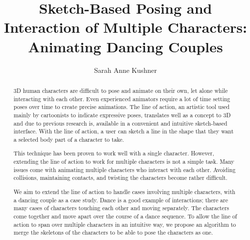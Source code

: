 \documentclass[12pt, a4paper, parskip=full, dvipsnames]{memoir} %
\title{Sketch-Based Posing and Interaction of Multiple Characters: Animating Dancing Couples} %
\author{Sarah Anne Kushner}
\date{\mydate} %
\begin{document}
\frontmatter
\begin{titlingpage}
\maketitle
\end{titlingpage}


\renewcommand{\abstracttextfont}{\normalfont}
\abstractintoc
\begin{abstract} 
3D human characters are difficult to pose and animate on their own, let alone while interacting with each other. Even experienced animators require a lot of time setting poses over time to create precise animations. The line of action, an artistic tool used mainly by cartoonists to indicate expressive poses, translates well as a concept to 3D and due to previous research is, available in a convenient and intuitive sketch-based interface. With the line of action, a user can sketch a line in the shape that they want a selected body part of a  character to take. 

This technique has been proven to work well with a single character. However, extending the line of action to work for multiple characters is not a simple task. Many issues come with animating multiple characters who interact with each other. Avoiding collisions, maintaining contacts, and twisting the characters become rather difficult.

We aim to extend the line of action to handle cases involving multiple characters, with a dancing couple as a case study. Dance is a good example of interactions; there are many cases of characters touching each other and moving separately. The characters come together and move apart over the course of a dance sequence. To allow the line of action to span over multiple characters in an intuitive way, we propose an algorithm to merge the skeletons of the characters to be able to pose the characters as one.

\end{abstract}
\abstractintoc
\newpage
\renewcommand\abstractname{R\'esum\'e}
\end{document}
